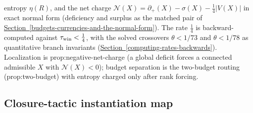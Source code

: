 \documentclass[
  11pt,
]{article}
\theoremstyle{definition}
\newcommand{\secref}[1]{\hyperref[#1]{Section~\ref*{#1}}}
\begin{document}
\begin{longtable}[]
entropy \(\eta(R)\), and the net charge
\(\mathcal N(X)=\partial_+(X)-\sigma(X)-\tfrac14|V(X)|\) in exact normal
form (deficiency and surplus as the matched pair of \secref{budgets-currencies-and-the-normal-form}). The rate
\(\tfrac14\) is backward-computed against \(\tau_{\rm win}<\tfrac14\),
with the solved crossovers \(\theta<1/73\) and \(\theta<1/78\) as
quantitative branch invariants (\secref{computing-rates-backwards}). Localization is
prop:negative-net-charge (a global deficit forces a connected admissible
\(X\) with \(\mathcal N(X)<0\)); budget separation is the two-budget
routing (prop:two-budget) with entropy charged only after rank
forcing. \\
\end{longtable}

\subsection{Closure-tactic instantiation
map}\label{b.2-closure-tactic-instantiation-map}
\end{document}
